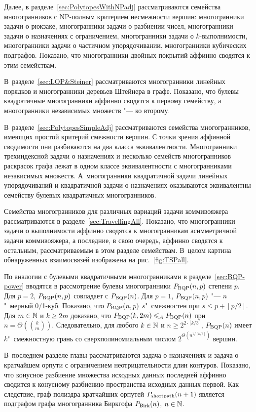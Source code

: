 Далее, в разделе~\ref{sec:PolytopesWithNPadj} рассматриваются семейства многогранников с NP-полным критерием несмежности вершин: многогранники задачи о рюкзаке, многогранники задачи о разбиении чисел, многогранники задачи о назначениях с ограничением, многогранники задачи о $k$-выполнимости, многогранники задачи о частичном упорядочивании, многогранники кубических подграфов. Показано, что многогранники двойных покрытий аффинно сводятся к этим семействам.

В~разделе~\ref{sec:LOP&Steiner} рассматриваются многогранники линейных порядков и многогранники деревьев Штейнера в графе. Показано, что булевы квадратичные многогранники аффинно сводятся к первому семейству, а многогранники независимых множеств "--- ко второму.

В~разделе~\ref{sec:PolytopesSimpleAdj} рассматриваются семейства многогранников, имеющих простой критерий смежности вершин. С точки зрения аффинной сводимости они разбиваются на два класса эквивалентности.
Многогранники трехиндексной задачи о назначениях и несколько семейств многогранников раскрасок графа лежат в одном классе эквивалентности с многогранниками независимых множеств. А~многогранники квадратичной задачи линейных упорядочиваний и квадратичной задачи о назначениях оказываются эквивалентны семейству булевых квадратичных многогранников.

Семейства многогранников для различных вариаций задачи коммивояжера рассматриваются в разделе~\ref{sec:TravellingAll}. Показано, что многогранники задачи о выполнимости аффинно сводятся к многогранникам асимметричной задачи коммивояжера, а последние, в свою очередь, аффинно сводятся к остальным, рассматриваемым в этом разделе семействам. В~целом картина обнаруженных взаимосвязей изображена на рис.~\ref{fig:TSPall}.

По аналогии с булевыми квадратичными многогранниками в разделе~\ref{sec:BQP-power} вводятся в рассмотрение
булевы многогранники $P_{\textup{BQP}}(n,p)$ степени $p$. 
Для $p=2$, $P_{\textup{BQP}}(n,p)$ совпадает с $P_{\textup{BQP}}(n)$. 
Для $p=1$, $P_{\textup{BQP}}(n,p)$ "--- $n$"~мерный 0/1-куб.
Показано, что $P_{\textup{BQP}}(n,p)$ $s$"~смежностен при
$s \le p + \left\lfloor p / 2 \right\rfloor$.
Для $m \in \mathbb{N}$ и $k \ge 2m$ доказано, что $P_{\textup{BQP}}(k,2m) \leqslant_A P_{\textup{BQP}}(n)$ при $n = \Theta(\binom{k}{m})$.
Следовательно, для любого $k \in \mathbb{N}$ и $n \ge 2^{2\cdot \lceil k/3\rceil}$, 
$P_{\textup{BQP}}(n)$ имеет $k$"~смежностную грань со сверхполиномиальным числом
$2^{{\Theta}\left( n^{1 / {\left\lceil k/3\right\rceil}}\right)}$ вершин.

В~последнем разделе главы рассматриваются задача о назначениях и задача о кратчайшем орпути с ограничением неотрицательности длин контуров. Показано, что конусное разбиение множества исходных данных последней аффинно сводится к конусному разбиению пространства исходных данных первой.
Как следствие, граф полиэдра кратчайших орпутей $P_{\textup{shortpath}}(n+1)$ является подграфом графа многогранника Биркгофа $P_{\textup{Birk}}(n)$, $n \in \mathbb{N}$.


